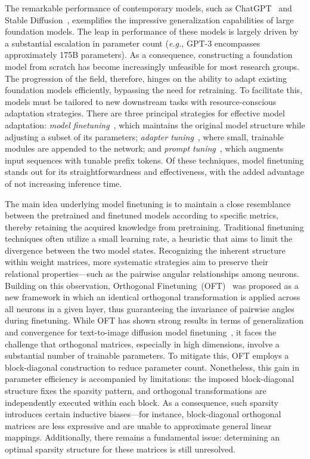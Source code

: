 The remarkable performance of contemporary models, such as ChatGPT~\cite{brown2020language,chen2021evaluating} and Stable Diffusion~\cite{rombach2022high}, exemplifies the impressive generalization capabilities of large foundation models. The leap in performance of these models is largely driven by a substantial escalation in parameter count (\emph{e.g.}, GPT-3 encompasses approximately 175B parameters). As a consequence, constructing a foundation model from scratch has become increasingly unfeasible for most research groups. The progression of the field, therefore, hinges on the ability to adapt existing foundation models efficiently, bypassing the need for retraining. To facilitate this, models must be tailored to new downstream tasks with resource-conscious adaptation strategies. There are three principal strategies for effective model adaptation: \emph{model finetuning}~\cite{hulora2022,zaken2022bitfit,guo2020parameter,raffel2020exploring,qiu2023controlling,zhang2022adaptive,chavan2023one}, which maintains the original model structure while adjusting a subset of its parameters; \emph{adapter tuning}~\cite{rebuffi2017learning,houlsby2019parameter,pfeiffer2020adapterfusion,lin2020exploring,he2021towards}, where small, trainable modules are appended to the network; and \emph{prompt tuning}~\cite{li2021prefix,lester2021power}, which augments input sequences with tunable prefix tokens. Of these techniques, model finetuning stands out for its straightforwardness and effectiveness, with the added advantage of not increasing inference time.

The main idea underlying model finetuning is to maintain a close resemblance between the pretrained and finetuned models according to specific metrics, thereby retaining the acquired knowledge from pretraining. Traditional finetuning techniques often utilize a small learning rate, a heuristic that aims to limit the divergence between the two model states. Recognizing the inherent structure within weight matrices, more systematic strategies aim to preserve their relational properties—such as the pairwise angular relationships among neurons. Building on this observation, Orthogonal Finetuning~(OFT)~\cite{qiu2023controlling} was proposed as a new framework in which an identical orthogonal transformation is applied across all neurons in a given layer, thus guaranteeing the invariance of pairwise angles during finetuning. While OFT has shown strong results in terms of generalization and convergence for text-to-image diffusion model finetuning~\cite{qiu2023controlling}, it faces the challenge that orthogonal matrices, especially in high dimensions, involve a substantial number of trainable parameters. To mitigate this, OFT employs a block-diagonal construction to reduce parameter count. Nonetheless, this gain in parameter efficiency is accompanied by limitations: the imposed block-diagonal structure fixes the sparsity pattern, and orthogonal transformations are independently executed within each block. As a consequence, such sparsity introduces certain inductive biases—for instance, block-diagonal orthogonal matrices are less expressive and are unable to approximate general linear mappings. Additionally, there remains a fundamental issue: determining an optimal sparsity structure for these matrices is still unresolved.

